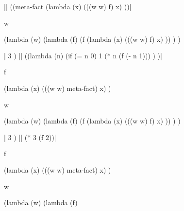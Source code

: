 \begin{code:lisp}
|\Equals|   ((meta-fact (lambda (x)
                 (((w w) f) x) ))|\begin{where}
                                  \- w {\eq} \begin{complex}
                                            \-(lambda (w)
                                            \-  (lambda (f)
                                            \-    (f (lambda (x)
                                            \-         (((w w) f) x) )) ) )
                                            \end{complex}
                                  \end{where}|
    3 )
|\Equals|   ((lambda (n)
      (if (= n 0) 1
          (* n (f (- n 1))) ) )|\begin{where}
                                \- f {\eq} \begin{complex}
                                          \-(lambda (x)
                                          \-  (((w w) meta-fact) x) )\begin{where}
                                                         \- w {\eq} \begin{complex*}{6.2cm}
                                                                   \-(lambda (w)
                                                                   \-  (lambda (f)
                                                                   \-    (f (lambda (x)
                                                                   \-         (((w w) f) x) )) ) )
                                                                   \end{complex*}
                                                         \end{where}
                                                  \end{complex}
                                \end{where}|
    3 )
|\Equals|   (* 3 (f 2))|\begin{where}
                        \- f {\eq} \begin{complex}
                                  \-(lambda (x)
                                  \-  (((w w) meta-fact) x) )\begin{where}
                                                             \- w {\eq} \begin{complex*}{4.8cm}
                                                                       \-(lambda (w)
                                                                       \-  (lambda (f)

\end{complex*}
\end{where}
\end{complex}
\end{where}
\end{code:lisp}

